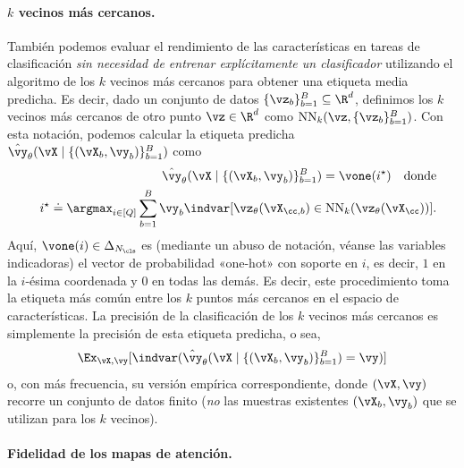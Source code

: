 \documentclass[../../book-main_es.tex]{subfiles}
\begin{document}
\paragraph{\(k\) vecinos más cercanos.}  También podemos evaluar el
rendimiento de las características en tareas de clasificación \textit{sin
necesidad de entrenar explícitamente un clasificador} utilizando el algoritmo de los \(k\) vecinos
más cercanos para obtener una etiqueta media predicha. Es decir, dado un
conjunto de datos \(\{\vz_{b}\}_{b = 1}^{B} \subseteq \R^{d}\), definimos los
\(k\) vecinos más cercanos de otro punto \(\vz \in \R^{d}\) como
\(\operatorname{NN}_{k}(\vz, \{\vz_{b}\}_{b = 1}^{B})\). Con esta
notación, podemos calcular la etiqueta predicha \(\hat{\vy}_{\theta}(\vX
\mid \{(\vX_{b}, \vy_{b})\}_{b = 1}^{B})\) como
\begin{eqnarray}
&&\hat{\vy}_{\theta}(\vX \mid \{(\vX_{b}, \vy_{b})\}_{b = 1}^{B}) =
\vone(i^{\star}) \quad \text{donde} \nonumber \\
&& i^{\star} \doteq \argmax_{i \in [Q]}\sum_{b =
1}^{B}\vy_{b}\indvar[\vz_{\theta}(\vX_{\cc, b}) \in
\operatorname{NN}_{k}(\vz_{\theta}(\vX_{\cc}))].
\end{eqnarray}
Aquí, \(\vone(i) \in \Delta_{N_{\cls}}\) es (mediante un abuso de notación,
véanse las variables indicadoras) el vector de probabilidad «one-hot» con soporte en
\(i\), es decir, \(1\) en la \(i\)-ésima coordenada y \(0\) en todas las demás.
Es decir, este procedimiento toma la etiqueta más común entre los \(k\)
puntos más cercanos en el espacio de características. La precisión de la clasificación de los \(k\) vecinos más cercanos
es simplemente la precisión de esta etiqueta predicha, o sea,
\begin{equation}
\Ex_{\vX, \vy}[\indvar(\hat{\vy}_{\theta}(\vX \mid \{(\vX_{b},
\vy_{b})\}_{b = 1}^{B}) = \vy)]
\end{equation}
o, con más frecuencia, su versión empírica correspondiente, donde \((\vX,
\vy)\) recorre un conjunto de datos finito (\textit{no} las muestras existentes
\((\vX_{b}, \vy_{b})\) que se utilizan para los \(k\) vecinos).

\paragraph{Fidelidad de los mapas de atención.}
\end{document}
